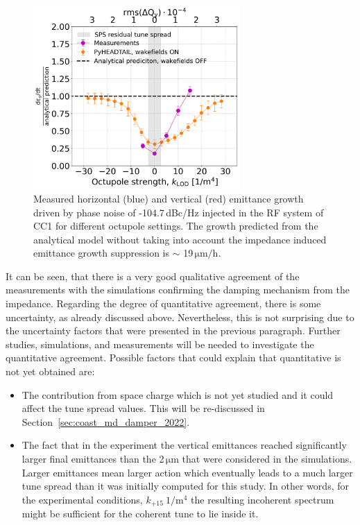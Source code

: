 \begin{figure}[!h]
   \centering         
   \includegraphics[width=0.7\textwidth]{images/Ch8/deyRates_sps_270GeV_PN1e-8_400MHz_SPS_NewWakesAllcontributions_appendWakes_y-plane_WakesONvsOFF_QpxQpy1_6D_Nb5e5_intensity3e10Scan_simulations_vs_measurements_magenta_new_legend.png}
       \caption{Measured horizontal (blue) and vertical (red) emittance growth driven by phase noise of -104.7\,dBc/Hz injected in the RF system of CC1 for different octupole settings. The growth predicted from the analytical model without taking into account the impedance induced emittance growth suppression is $\sim$ 19\,$\mathrm{\mu m/h}$.}
       \label{fig:cc_md_2022_measurement_vs_pyheadtail_simualtion}
\end{figure}

It can be seen, that there is a very good qualitative agreement of the measurements with the simulations confirming the damping mechanism from the impedance. Regarding the degree of quantitative agreement, there is some uncertainty, as already discussed above. Nevertheless, this is not surprising due to the uncertainty factors that were presented in the previous paragraph. Further studies, simulations, and measurements will be needed to investigate the quantitative agreement. Possible factors that could explain that quantitative is not yet obtained are:

\begin{itemize}
   \item The contribution from space charge which is not yet studied and it could affect the tune spread values. This will be re-discussed in Section~\ref{sec:coast_md_damper_2022}.
   \item The fact that in the experiment the vertical emittances reached significantly larger final emittances than the 2\,$\mathrm{\mu m}$ that were considered in the simulations. Larger emittances mean larger action which eventually leads to a much larger tune spread than it was initially computed for this study. In other words, for the experimental conditions, $k_\mathrm{+15} \ \mathrm{1/m^4}$ the resulting incoherent spectrum might be sufficient for the coherent tune to lie inside it.
\end{itemize}

